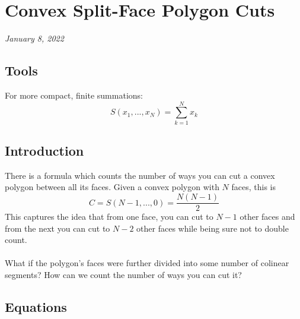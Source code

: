 \documentclass[12pt]{article}
\begin{document}
\section*{Convex Split-Face Polygon Cuts}
{\em{January 8, 2022}}

\subsection*{Tools}

For more compact, finite summations:
\begin{equation}
    S(x_1,...,x_N) = \sum_{k=1}^{N} x_k
\end{equation}

\subsection*{Introduction}

There is a formula which counts the number of ways you can cut a convex polygon
between all its faces. Given a convex polygon with $N$ faces, this is
\begin{equation}
    C = S(N-1,...,0) = \frac{N (N - 1)}{2}
\end{equation}
This captures the idea that from one face, you can cut to $N-1$ other faces and from
the next you can cut to $N-2$ other faces while being sure not to double count.
\\
\\
What if the polygon's faces were further divided into some number of colinear
segments? How can we count the number of ways you can cut it?

\subsection*{Equations}
\end{document}
